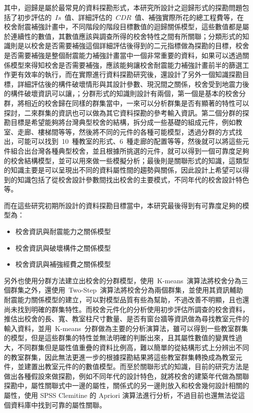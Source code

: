 其中，迴歸是屬於最常見的資料探勘形式，本研究所設計之迴歸形式的探勘問題包括了初步評估的~$Is$~值、詳細評估的~$CDR$~值、補強實際所花的總工程費等，在校舍耐震補強計畫中，不同階段的階段目標數值的迴歸關係模型，這些數值都是屬於連續性的數值，其數值應該與調查所得的校舍特性之間有所關聯；分類形式的知識則是以校舍是否需要補強這個詳細評估後得到的二元指標做為探勘的目標，校舍是否需要補強是整個耐震能力補強計畫當中一個非常重要的資料，如果可以透過關係模型來得知校舍是否需要補強，應該能夠讓校舍耐震能力補強計畫前半的篩選工作更有效率的執行，而在實際進行資料探勘研究後，還設計了另外一個知識探勘目標，詳細評估後的構件破壞情形與其設計參數、現況間之關係，校舍受到地震力後的構件破壞資訊可以讓，；分群形式的知識則設計有兩個，第一個是基本的校舍分群，將相近的校舍歸在同樣的群集當中，一來可以分析群集是否有顯著的特性可以探討，二來群集的資訊也可以做為其它資料探勘的參考輸入資訊。第二個分群的探勘目標是希望能夠將台灣典型校舍的結構，拆分成一些基礎的組成元件，例如教室、走廊、樓梯間等等，然後將不同的元件的各種可能模型，透過分群的方式找出，可能可以找到~10~種教室的形式、6~種走廊的配置等等，然後就可以將這些元件組合出台灣各種典型校舍，並且根據所挑選的元件，就可以得到一個可靠度足夠的校舍結構模型，並可以用來做一些模擬分析；最後則是關聯形式的知識，這類型的知識主要是可以呈現出不同的資料屬性間的趨勢與關係，因此設計上希望可以得到的知識包括了從校舍設計參數間找出校舍的主要模式，不同年代的校舍設計特色等。

而在這些研究初期所設計的資料探勘目標當中，本研究最後得到有可靠度足夠的模型為：

\begin{itemize}
  \item 校舍資訊與耐震能力之關係模型
  \item 校舍資訊與破壞構件之關係模型
  \item 校舍資訊與補強經費之關係模型
\end{itemize}

另外也使用分群方法建立出校舍的分群模型，使用~K-means~演算法將校舍分為三個群集之外，還使用~Two-Step~演算法將校舍分為兩個群集，並使用其資訊輔助耐震能力關係模型的建立，可以對模型品質有些為幫助，不過改善不明顯，且也還尚未找到明確的群集特性。而校舍元件化的分析使用初步評估所調查的校舍資料，推估出校舍的長、寬、教室柱尺寸數量、是否有窗台牆等資訊做為尋找教室元件的輸入資料，並用~K-means~分群做為主要的分析演算法，雖可以得到一些教室群集的模型，但是這些群集的特性並無法明確的判斷出來，且其屬性數值的變異性過大，不同群集但是屬性值重疊的資料比例高，難以簡單的從結構形式上分辨出不同的教室群集，因此無法更進一步的根據探勘結果將這些教室群集轉換成為教室元件，並建置出教室元件的的數值模型。而至於關聯形式的知識，目前的研究方法是做出各種假設來做探勘，例如不同年代的設計特色，就將校舍的建築年代做為關聯探勘中，屬性關聯式中一邊的屬性，關係式的另一邊則放入和校舍幾何設計相關的屬性，使用 SPSS Clemitine 的 Apriori 演算法進行分析，不過目前也還無法從這個資料庫中找到可靠的屬性關聯。


